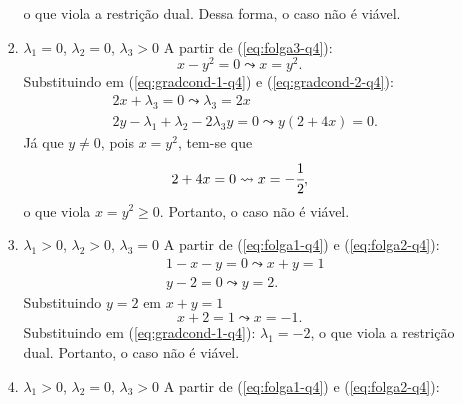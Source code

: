 \documentclass[11pt,a4paper]{article}
\begin{document}
\begin{enumerate}
\begin{itemize}
\begin{enumerate}[label=\roman*]
\begin{equation*}
                \end{equation*}
                o que viola a restrição dual. Dessa forma, o caso não é viável.
                \item $\lambda_1 = 0$, $\lambda_2 = 0$, $\lambda_3 > 0$
                A partir de (\ref{eq:folga3-q4}):
                \begin{equation*}
                    x - y^2 = 0 \leadsto x = y^2.
                \end{equation*}
                Substituindo em (\ref{eq:gradcond-1-q4}) e (\ref{eq:gradcond-2-q4}):
                \begin{equation*}
                    \begin{aligned}
                        &2x + \lambda_3 = 0 \leadsto \lambda_3 = 2x\\
                        &2y - \lambda_1 + \lambda_2 - 2\lambda_3y = 0 \leadsto y(2 + 4x) = 0.
                    \end{aligned}
                \end{equation*}
                Já que $y \neq 0$, pois $x = y^2$, tem-se que
                \begin{equation*}
                    2 + 4x = 0 \leadsto x = -\cfrac{1}{2},
                \end{equation*}
                \noindent o que viola $x = y^2 \geq 0$. Portanto, o caso não é viável.
                \item $\lambda_1 > 0$, $\lambda_2 > 0$, $\lambda_3 = 0$
                A partir de (\ref{eq:folga1-q4}) e (\ref{eq:folga2-q4}):
                \begin{equation*}
                    \begin{aligned}
                        & 1 - x - y = 0 \leadsto x + y = 1\\
                        & y - 2 = 0 \leadsto y = 2.
                    \end{aligned}
                \end{equation*}
                Substituindo $y = 2$ em $x + y = 1$
                \begin{equation*}
                    x + 2 = 1 \leadsto x = -1.
                \end{equation*}
                Substituindo em (\ref{eq:gradcond-1-q4}): $\lambda_1 = -2$, o que viola a restrição dual. Portanto, o caso não é viável.
                \item $\lambda_1 > 0$, $\lambda_2 = 0$, $\lambda_3 > 0$
                A partir de (\ref{eq:folga1-q4}) e (\ref{eq:folga2-q4}):

\end{enumerate}
\end{itemize}
\end{enumerate}
\end{document}
